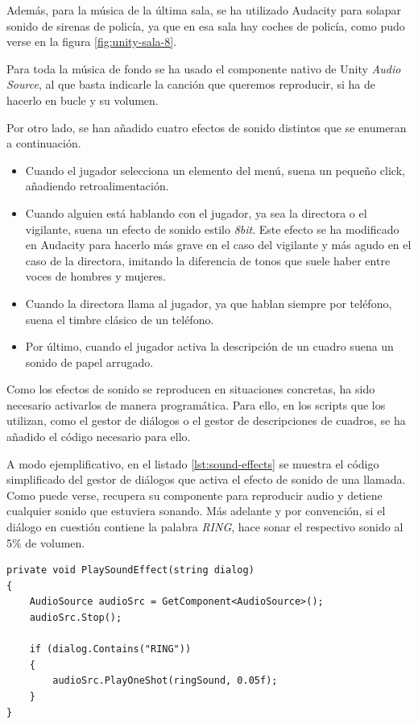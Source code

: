 Además, para la música de la última sala, se ha utilizado Audacity para solapar sonido de sirenas de policía, ya que en esa sala hay coches de policía, como pudo verse en la figura \ref{fig:unity-sala-8}.

Para toda la música de fondo se ha usado el componente nativo de Unity \textit{Audio Source}, al que basta indicarle la canción que queremos reproducir, si ha de hacerlo en bucle y su volumen.

Por otro lado, se han añadido cuatro efectos de sonido distintos que se enumeran a continuación.

\begin{itemize}
    \item Cuando el jugador selecciona un elemento del menú, suena un pequeño click, añadiendo retroalimentación.
    \item Cuando alguien está hablando con el jugador, ya sea la directora o el vigilante, suena un efecto de sonido estilo \textit{8bit}. Este efecto se ha modificado en Audacity para hacerlo más grave en el caso del vigilante y más agudo en el caso de la directora, imitando la diferencia de tonos que suele haber entre voces de hombres y mujeres.
    \item Cuando la directora llama al jugador, ya que hablan siempre por teléfono, suena el timbre clásico de un teléfono.
    \item Por último, cuando el jugador activa la descripción de un cuadro suena un sonido de papel arrugado.
\end{itemize}

Como los efectos de sonido se reproducen en situaciones concretas, ha sido necesario activarlos de manera programática. Para ello, en los scripts que los utilizan, como el gestor de diálogos o el gestor de descripciones de cuadros, se ha añadido el código necesario para ello.

A modo ejemplificativo, en el listado \ref{lst:sound-effects} se muestra el código simplificado del gestor de diálogos que activa el efecto de sonido de una llamada. Como puede verse, recupera su componente para reproducir audio y detiene cualquier sonido que estuviera sonando. Más adelante y por convención, si el diálogo en cuestión contiene la palabra \textit{RING}, hace sonar el respectivo sonido al 5\% de volumen.

\begin{lstlisting}[caption=Fragmento del script para activar efectos de sonido, label=lst:sound-effects]
private void PlaySoundEffect(string dialog)
{       
    AudioSource audioSrc = GetComponent<AudioSource>();
    audioSrc.Stop();

    if (dialog.Contains("RING"))
    {
        audioSrc.PlayOneShot(ringSound, 0.05f);
    }
}
\end{lstlisting}

